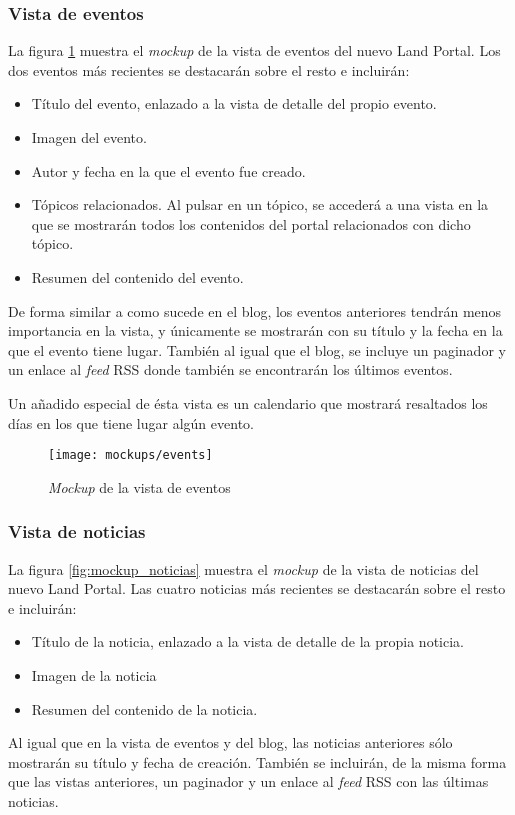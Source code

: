 \subsubsection{Vista de eventos}
La figura \ref{fig:mockup_eventos} muestra el \textit{mockup} de la vista de eventos del nuevo Land Portal.  Los dos eventos más recientes se destacarán sobre el resto e incluirán:
\begin{itemize}
	\item Título del evento, enlazado a la vista de detalle del propio evento.
	\item Imagen del evento.
	\item Autor y fecha en la que el evento fue creado.
	\item Tópicos relacionados.  Al pulsar en un tópico, se accederá a una vista en la que se mostrarán todos los contenidos del portal relacionados con dicho tópico.
	\item Resumen del contenido del evento.
\end{itemize}
De forma similar a como sucede en el blog, los eventos anteriores tendrán menos importancia en la vista, y únicamente se mostrarán con su título y la fecha en la que el evento tiene lugar.  También al igual que el blog, se incluye un paginador y un enlace al \textit{feed} RSS donde también se encontrarán los últimos eventos.

Un añadido especial de ésta vista es un calendario que mostrará resaltados los días en los que tiene lugar algún evento.
\begin{figure}[h]
	\centering
	\texttt{[image: mockups/events]}
	\caption{\textit{Mockup} de la vista de eventos}
	\label{fig:mockup_eventos}
\end{figure}


\subsubsection{Vista de noticias}
La figura \ref{fig:mockup_noticias} muestra el \textit{mockup} de la vista de noticias del nuevo Land Portal.  Las cuatro noticias más recientes se destacarán sobre el resto e incluirán:
\begin{itemize}
	\item Título de la noticia, enlazado a la vista de detalle de la propia noticia.
	\item Imagen de la noticia
	\item Resumen del contenido de la noticia.
\end{itemize}
Al igual que en la vista de eventos y del blog, las noticias anteriores sólo mostrarán su título y fecha de creación.  También se incluirán, de la misma forma que las vistas anteriores, un paginador y un enlace al \textit{feed} RSS con las últimas noticias.

